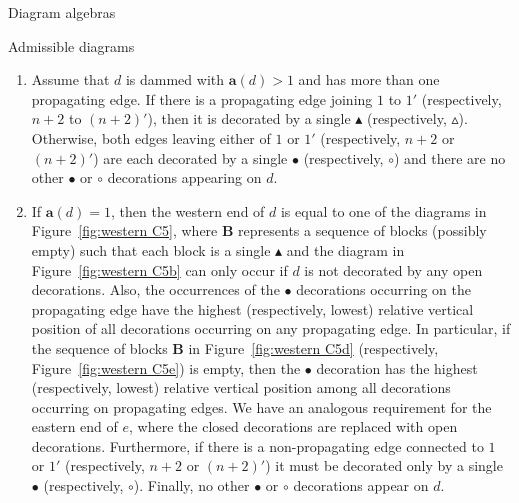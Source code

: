 \documentclass[11pt]{amsart}
\theoremstyle{definition}
\numberwithin{equation}{section}
\newcommand{\wtri}{\vartriangle}
\newcommand{\btri}{\blacktriangle}
\renewcommand{\a}{\mathbf{a}}
\newcommand{\wcirc}{\circ}
\newcommand{\bcirc}{\bullet}
\renewcommand{\(}{\left(}
\renewcommand{\)}{\right)}
\begin{document}
\begin{section}{Diagram algebras}
\begin{subsection}{Admissible diagrams}
\begin{enumerate}[label=\rm{(C\arabic*)}]
\item \label{C4} Assume that $d$ is dammed with $\a(d)>1$ and has more than one propagating edge.  If there is a propagating edge joining $1$ to $1'$ (respectively, $n+2$ to $(n+2)'$), then it is decorated by a single $\btri$ (respectively, $\wtri$).  Otherwise, both edges leaving either of $1$ or $1'$ (respectively, $n+2$ or $(n+2)'$) are each decorated by a single $\bcirc$ (respectively, $\wcirc$) and there are no other $\bcirc$ or $\wcirc$ decorations appearing on $d$.

\item \label{C5} If $\a(d)=1$, then the western end of $d$ is equal to one of the diagrams in Figure~\ref{fig:western C5}, where $\mathbf{B}$ represents a sequence of blocks (possibly empty) such that each block is a single $\btri$ and the diagram in Figure~\ref{fig:western C5b} can only occur if $d$ is not decorated by any open decorations.  Also, the occurrences of the $\bcirc$ decorations occurring on the propagating edge have the highest (respectively, lowest) relative vertical position of all decorations occurring on any propagating edge.  In particular, if the sequence of blocks $\mathbf{B}$ in Figure~\ref{fig:western C5d} (respectively, Figure~\ref{fig:western C5e}) is empty, then the $\bcirc$ decoration has the highest (respectively, lowest) relative vertical position among all decorations occurring on propagating edges.  We have an analogous requirement for the eastern end of $e$, where the closed decorations are replaced with open decorations.  Furthermore, if there is a non-propagating edge connected to $1$ or $1'$ (respectively, $n+2$ or $(n+2)'$) it must be decorated only by a single $\bcirc$ (respectively, $\wcirc$).  Finally, no other $\bcirc$ or $\wcirc$ decorations appear on $d$.
\end{enumerate}


\end{subsection}
\end{section}
\end{document}
